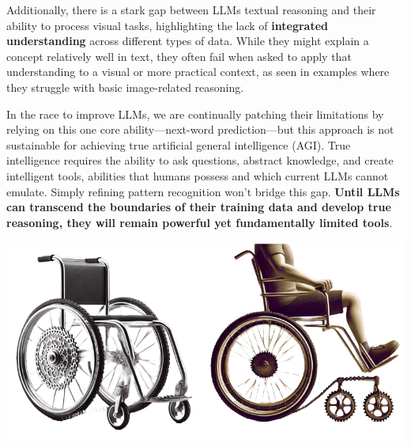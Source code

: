 \documentclass[11pt]{scrartcl}
\begin{document}
Additionally, there is a stark gap between LLMs textual reasoning and their ability to process visual tasks, highlighting the lack of \textbf{integrated understanding} across different types of data. While they might explain a concept relatively well in text, they often fail when asked to apply that understanding to a visual or more practical context, as seen in examples where they struggle with basic image-related reasoning.

In the race to improve LLMs, we are continually patching their limitations by relying on this one core ability—next-word prediction—but this approach is not sustainable for achieving true artificial general intelligence (AGI). True intelligence requires the ability to ask questions, abstract knowledge, and create intelligent tools, abilities that humans possess and which current LLMs cannot emulate. Simply refining pattern recognition won’t bridge this gap. \textbf{Until LLMs can transcend the boundaries of their training data and develop true reasoning, they will remain powerful yet fundamentally limited tools}. 

\vspace{1cm}

\includegraphics[width=0.99\linewidth, center]{conclusion_image.png}

\vspace{1cm}
\end{document}
